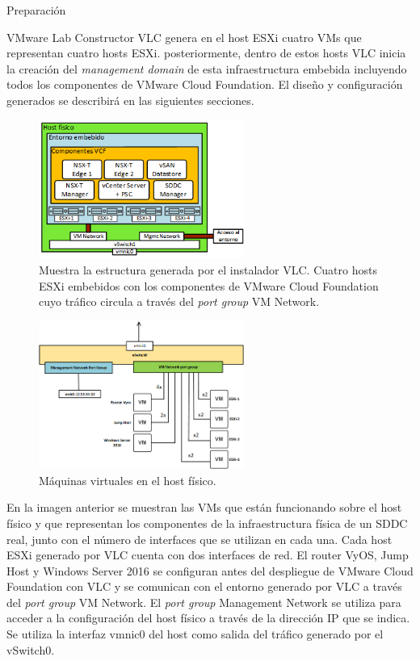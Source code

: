 \begin{subsection}{Preparación}
    \begin{subsubsection}{VMware Lab Constructor}
      VLC genera en el host ESXi cuatro VMs que representan cuatro hosts ESXi. posteriormente, dentro de estos hosts VLC inicia la creación del \textit{management domain} de esta infraestructura embebida incluyendo todos los componentes de VMware Cloud Foundation. El diseño y configuración generados se describirá en las siguientes secciones.
      \begin{figure}[h!]
        \centering
        \includegraphics[width=0.6\textwidth]{imaxes/pruebaconcepto/hostFisico.png}
        \caption{Muestra la estructura generada por el instalador VLC. Cuatro hosts ESXi embebidos con los componentes de VMware Cloud Foundation cuyo tráfico circula a través del \textit{port group} VM Network.}
        \label{fig:estructura-generada-por-VLC}
      \end{figure}
      \FloatBarrier
  
      \begin{figure}[h]
        \centering
        \includegraphics[width=0.6\textwidth]{imaxes/pruebaconcepto/vSwitch0HostFisico.png}
        \caption{Máquinas virtuales en el host físico.}
        \label{fig:VMs-alojadas-host-fisico}
      \end{figure}
      \FloatBarrier
  
      En la imagen anterior se muestran las VMs que están funcionando sobre el host físico y que representan los componentes de la infraestructura física de un SDDC real, junto con el número de interfaces que se utilizan en cada una. Cada host ESXi generado por VLC cuenta con dos interfaces de red. El router VyOS, Jump Host y Windows Server 2016 se configuran antes del despliegue de VMware Cloud Foundation con VLC y se comunican con el entorno generado por VLC a través del \textit{port group} VM Network. El \textit{port group} Management Network se utiliza para acceder a la configuración del host físico a través de la dirección IP que se indica. Se utiliza la interfaz vmnic0 del host como salida del tráfico generado por el vSwitch0.
      \FloatBarrier
  

\end{subsubsection}
\end{subsection}
